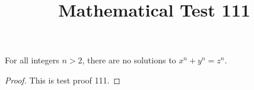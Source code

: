 \documentclass{amsart}
\begin{document}
\title{Mathematical Test 111}
\begin{theorem}
For all integers $n > 2$, there are no solutions to $x^n + y^n = z^n$.
\end{theorem}
\begin{proof}
This is test proof 111.
\end{proof}
\end{document}
